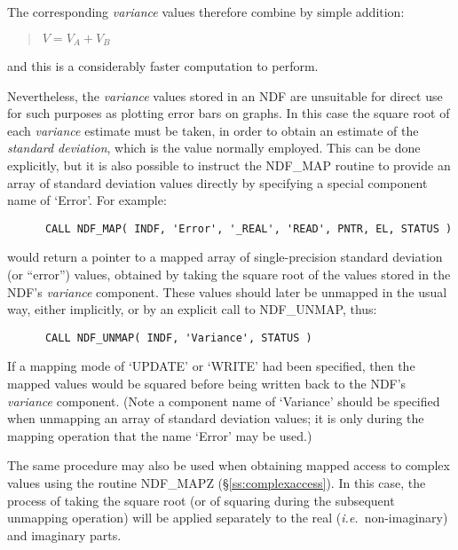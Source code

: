 \documentclass[twoside,11pt]{article}
\newcommand{\htmlref}[2]{#1}
\newcommand{\st}[1]{{\em{#1}}}
\begin{document}
The corresponding \st{variance\/} values therefore combine by simple
addition: 

\small
\begin{quote}
\begin{center}
$V = V_{A} + V_{B}$
\end{center}
\end{quote}
\normalsize

and this is a considerably faster computation to perform.

Nevertheless, the \st{variance\/} values stored in an NDF are unsuitable
for direct use for such purposes as plotting error bars on graphs. 
In this case the square root of each \st{variance\/} estimate must be
taken, in order to obtain an estimate of the \st{standard deviation}, which
is the value normally employed. 
This can be done explicitly, but it is also possible to instruct the
\htmlref{NDF\_MAP}{NDF_MAP} routine to provide an array of standard deviation values directly
by specifying a special component name of `Error'. 
For example:

\small
\begin{verbatim}
      CALL NDF_MAP( INDF, 'Error', '_REAL', 'READ', PNTR, EL, STATUS )
\end{verbatim}
\normalsize

would return a pointer to a mapped array of single-precision standard
deviation (or ``error'') values, obtained by taking the square root of the
values stored in the NDF's \st{variance\/} component. 
These values should later be unmapped in the usual way, either implicitly,
or by an explicit call to \htmlref{NDF\_UNMAP}{NDF_UNMAP}, thus: 

\small
\begin{verbatim}
      CALL NDF_UNMAP( INDF, 'Variance', STATUS )
\end{verbatim}
\normalsize

If a mapping mode of `UPDATE' or `WRITE' had been specified, then the mapped
values would be squared before being written back to the NDF's
\st{variance\/} component.  
(Note a component name of `Variance' should be specified when unmapping an 
array of standard deviation values; it is only during the mapping operation 
that the name `Error' may be used.)

The same procedure may also be used when obtaining mapped access to complex
values using the routine \htmlref{NDF\_MAPZ}{NDF_MAPZ} (\S\ref{ss:complexaccess}). 
In this case, the process of taking the square root (or of squaring during
the subsequent unmapping operation) will be applied separately to the real
(\st{i.e.}\ non-imaginary) and imaginary parts. 
\end{document}
